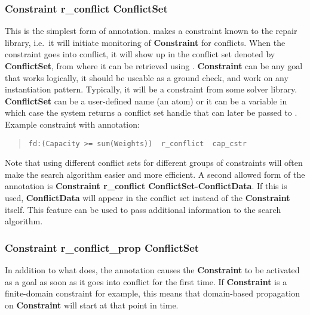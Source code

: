 \subsubsection{Constraint r_conflict ConflictSet}
This is the simplest form of annotation.
makes a constraint known
to the repair library, i.e.\ it will initiate monitoring of
{\bf Constraint} for conflicts.
When the constraint goes into conflict, it will show up in the
conflict set denoted by {\bf ConflictSet}, from where it can be
retrieved using .
{\bf Constraint} can be any goal that works logically, it should be useable
as a ground check, and work on any instantiation pattern. Typically,
it will be a constraint from some solver library.
{\bf ConflictSet} can be a user-defined name (an atom) or it can be
a variable in which case the system returns a conflict set handle that can
later be passed to . Example constraint with
annotation:
\begin{quote}\begin{verbatim}
fd:(Capacity >= sum(Weights))  r_conflict  cap_cstr
\end{verbatim}\end{quote}
Note that using different conflict sets for different groups of constraints
will often make the search algorithm easier and more efficient.
A second allowed form of the
annotation is
{\bf Constraint r_conflict ConflictSet-ConflictData}.
If this is used, {\bf ConflictData} will appear in the conflict
set instead of the {\bf Constraint} itself.
This feature can be used to pass additional information to the
search algorithm.


\subsubsection{Constraint r_conflict_prop ConflictSet}
In addition to what
does, the
annotation causes the
{\bf Constraint} to be activated as a goal as soon as it goes into
conflict for the first time. If {\bf Constraint} is a finite-domain
constraint for example, this means that domain-based propagation on
{\bf Constraint} will start at that point in time.

